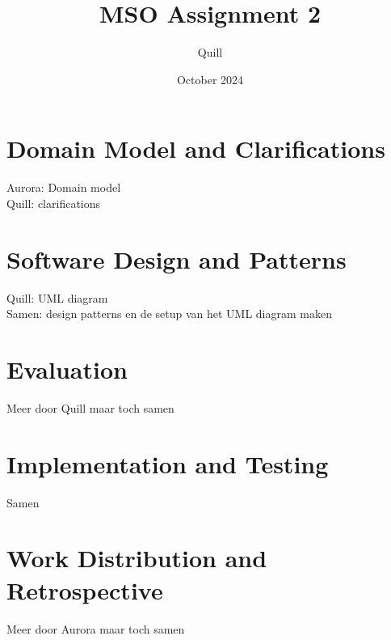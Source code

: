 \documentclass{article}
\title{MSO Assignment 2}
\author{Quill }
\date{October 2024}
\begin{document}
\maketitle

\section{Domain Model and Clarifications}
Aurora: Domain model\\
Quill: clarifications

\section{Software Design and Patterns}
Quill: UML diagram\\
Samen: design patterns en de setup van het UML diagram maken

\section{Evaluation}
Meer door Quill maar toch samen

\section{Implementation and Testing}
Samen

\section{Work Distribution and Retrospective}
Meer door Aurora maar toch samen
\end{document}
